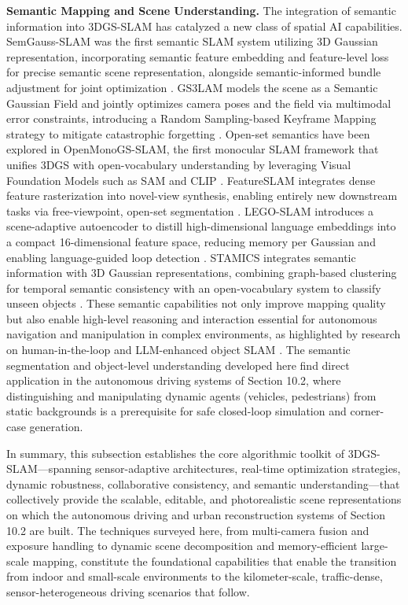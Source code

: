 \documentclass[11pt]{article}
\begin{document}
\textbf{Semantic Mapping and Scene Understanding.} The integration of semantic information into 3DGS-SLAM has catalyzed a new class of spatial AI capabilities. SemGauss-SLAM was the first semantic SLAM system utilizing 3D Gaussian representation, incorporating semantic feature embedding and feature-level loss for precise semantic scene representation, alongside semantic-informed bundle adjustment for joint optimization \cite{ref651}. GS3LAM models the scene as a Semantic Gaussian Field and jointly optimizes camera poses and the field via multimodal error constraints, introducing a Random Sampling-based Keyframe Mapping strategy to mitigate catastrophic forgetting \cite{ref652}. Open-set semantics have been explored in OpenMonoGS-SLAM, the first monocular SLAM framework that unifies 3DGS with open-vocabulary understanding by leveraging Visual Foundation Models such as SAM and CLIP \cite{ref653}. FeatureSLAM integrates dense feature rasterization into novel-view synthesis, enabling entirely new downstream tasks via free-viewpoint, open-set segmentation \cite{ref654}. LEGO-SLAM introduces a scene-adaptive autoencoder to distill high-dimensional language embeddings into a compact 16-dimensional feature space, reducing memory per Gaussian and enabling language-guided loop detection \cite{ref655}. STAMICS integrates semantic information with 3D Gaussian representations, combining graph-based clustering for temporal semantic consistency with an open-vocabulary system to classify unseen objects \cite{ref656}. These semantic capabilities not only improve mapping quality but also enable high-level reasoning and interaction essential for autonomous navigation and manipulation in complex environments, as highlighted by research on human-in-the-loop and LLM-enhanced object SLAM \cite{ref657,ref658}. The semantic segmentation and object-level understanding developed here find direct application in the autonomous driving systems of Section 10.2, where distinguishing and manipulating dynamic agents (vehicles, pedestrians) from static backgrounds is a prerequisite for safe closed-loop simulation and corner-case generation.

In summary, this subsection establishes the core algorithmic toolkit of 3DGS-SLAM---spanning sensor-adaptive architectures, real-time optimization strategies, dynamic robustness, collaborative consistency, and semantic understanding---that collectively provide the scalable, editable, and photorealistic scene representations on which the autonomous driving and urban reconstruction systems of Section 10.2 are built. The techniques surveyed here, from multi-camera fusion and exposure handling to dynamic scene decomposition and memory-efficient large-scale mapping, constitute the foundational capabilities that enable the transition from indoor and small-scale environments to the kilometer-scale, traffic-dense, sensor-heterogeneous driving scenarios that follow.
\end{document}
